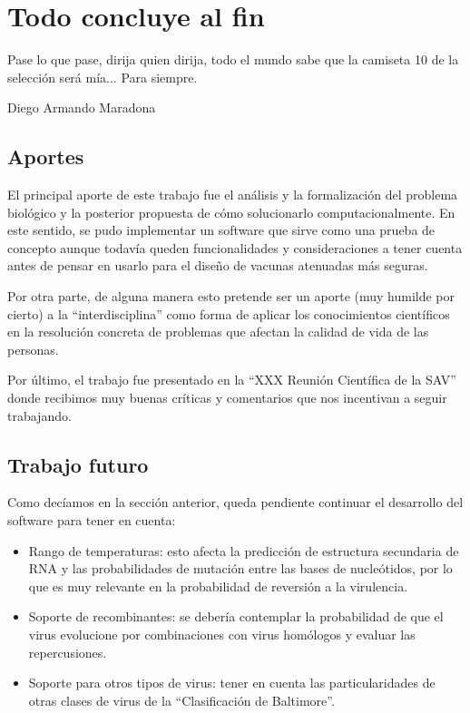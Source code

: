 \chapter{Todo concluye al fin}
\epigraph{Pase lo que pase, dirija quien dirija, todo el mundo sabe que la
camiseta 10 de la selecci\'on ser\'a m\'ia... Para siempre.}%
{Diego Armando Maradona}

\section{Aportes}

El principal aporte de este trabajo fue el an\'alisis y la formalizaci\'on del
problema biol\'ogico y la posterior propuesta de c\'omo solucionarlo
computacionalmente. En este sentido, se pudo implementar un software que sirve
como una prueba de concepto aunque todav\'ia queden funcionalidades y
consideraciones a tener cuenta antes de pensar en usarlo para el dise\~no de
vacunas atenuadas m\'as seguras.

Por otra parte, de alguna manera esto pretende ser un aporte (muy humilde por
cierto) a la ``interdisciplina'' como forma de aplicar los conocimientos
cient\'ificos en la resoluci\'on concreta de problemas que afectan la calidad de
vida de las personas.

Por \'ultimo, el trabajo fue presentado en la ``XXX Reuni\'on Cient\'ifica de la
\ac{SAV}'' donde recibimos muy buenas cr\'iticas y comentarios que
nos incentivan a seguir trabajando.

\section{Trabajo futuro}

Como dec\'iamos en la secci\'on anterior, queda pendiente continuar el
desarrollo del software para tener en cuenta:
\begin{itemize}
 \item Rango de temperaturas: esto afecta la predicci\'on de estructura
secundaria de \ac{RNA} y las probabilidades de mutaci\'on entre las bases de
nucle\'otidos, por lo que es muy relevante en la probabilidad de reversi\'on a
la virulencia.
 \item Soporte de recombinantes: se deber\'ia contemplar la probabilidad de que
el virus evolucione por combinaciones con virus hom\'ologos y evaluar las
repercusiones.
 \item Soporte para otros tipos de virus: tener en cuenta las particularidades
de otras clases de virus de la ``Clasificaci\'on de Baltimore''.
\end{itemize}

